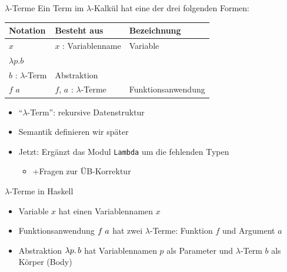 \documentclass{beamer}
\begin{document}
\begin{frame}{$\lambda$-Terme}
	Ein Term im $\lambda$-Kalkül hat eine der drei folgenden Formen:

	\vspace{0.5cm}

	\begin{tabularx}{\textwidth}{ X | X | X }
		\textbf{Notation} & \textbf{Besteht aus}                      & \textbf{Bezeichnung} \\
		\hline
		$x$               & $x$ : Variablenname                       & Variable             \\
		\hline
		$\lambda{}p.b$    &
			\begin{tabular}[t]{@{}c@{}}$p$ : Variablenname\\$b$ : $\lambda$-Term\end{tabular}
									      & Abstraktion          \\
		\hline
		$f$ $a$           & $f$, $a$ : $\lambda$-Terme                & Funktionsanwendung   \\
	\end{tabularx}

	\vspace{0.5cm}

	\begin{itemize}
		\item \enquote{$\lambda$-Term}: rekursive Datenstruktur
		\item Semantik definieren wir später
		\pause
		\item Jetzt: Ergänzt das Modul \texttt{Lambda} um die fehlenden Typen
		\begin{itemize}
			\item +Fragen zur ÜB-Korrektur
		\end{itemize}
	\end{itemize}
\end{frame}

\begin{frame}{$\lambda$-Terme in Haskell}

    \begin{itemize}
        \item Variable $x$ hat einen Variablennamen $x$
        \item Funktionsanwendung $f\;a$ hat zwei $\lambda$-Terme: Funktion $f$ und Argument $a$
        \item Abstraktion $\lambda p.\, b$ hat Variablennamen $p$ als Parameter und $\lambda$-Term $b$ als Körper (Body)
    \end{itemize}
\end{frame}
\end{document}
